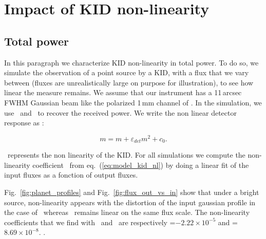 \section{Impact of KID non-linearity}
\label{se:KID_NL}

\subsection{Total power}

In this paragraph we characterize KID non-linearity in total power. To do so, we simulate the observation of a point source by a KID, with a flux that we vary between  (fluxes are unrealistically large on purpose for illustration), to see how linear the measure remains. We assume that our instrument has a 11\,arcsec FWHM Gaussian beam like the polarized 1\,mm channel of \nikad. In the simulation, we use \methodu\ and  \methodd\ to recover the received power. We write the non linear detector response as :

\begin{equation}
m = m + \varepsilon_{det} m^2 +c_{0}.
\label{eq:model_kid_nl}
\end{equation}

\epsDET\ represents the non linearity of the KID. 
For all simulations we compute the non-linearity coefficient \epsDET\ from eq.~(\ref{eq:model_kid_nl}) by doing a linear fit of the input fluxes as a fonction of output fluxes.

Fig.~\ref{fig:planet_profiles} and Fig.~\ref{fig:flux_out_vs_in} show that under a bright source, non-linearity appears with the distortion of the input gaussian profile in the case of \methodu\ whereas \methodd\ remains linear on the same flux scale. The non-linearity coefficients that we find with \methodu\ and \methodd\ are respectively \epsDET =$-2.22 \times 10^{-5}$ and \epsDET =$8.69 \times 10^{-8}$. .



